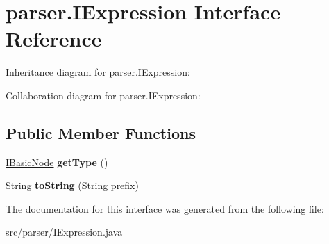 \hypertarget{interfaceparser_1_1_i_expression}{}\section{parser.\+I\+Expression Interface Reference}
\label{interfaceparser_1_1_i_expression}


Inheritance diagram for parser.\+I\+Expression\+:


Collaboration diagram for parser.\+I\+Expression\+:
\subsection*{Public Member Functions}
\begin{DoxyCompactItemize}
\item 
\hyperlink{interfaceparser_1_1_i_basic_node}{I\+Basic\+Node} {\bfseries get\+Type} ()\hypertarget{interfaceparser_1_1_i_expression_a429603bf9233471c412d71120b10154d}{}\label{interfaceparser_1_1_i_expression_a429603bf9233471c412d71120b10154d}

\item 
String {\bfseries to\+String} (String prefix)\hypertarget{interfaceparser_1_1_i_expression_a8e14f5adddee4c59ffd54e7a7893fea2}{}\label{interfaceparser_1_1_i_expression_a8e14f5adddee4c59ffd54e7a7893fea2}

\end{DoxyCompactItemize}


The documentation for this interface was generated from the following file\+:\begin{DoxyCompactItemize}
\item 
src/parser/I\+Expression.\+java\end{DoxyCompactItemize}
